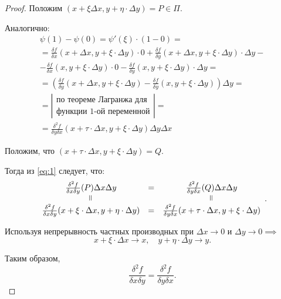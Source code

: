 \begin{proof}
    Положим $ (x + \xi \Delta x, y + \eta\cdot \Delta y) = P \in \Pi $.

    Аналогично:
    \begin{multline*}
        \psi(1) - \psi(0) = \psi'(\xi) \cdot (1-0) = \\
        = \frac{\delta f}{\delta x}(x + \Delta x, y + \xi \cdot \Delta y) \cdot 0 + \frac{\delta f}{\delta y}(x + \Delta x, y + \xi \cdot \Delta y) \cdot \Delta y - \\
        - \frac{\delta f}{\delta x}(x, y + \xi \cdot \Delta y) \cdot 0 - \frac{\delta f}{\delta y}(x, y + \xi \cdot \Delta y) \cdot \Delta y = \\
        = \left(\frac{\delta f}{\delta y}(x + \Delta x,y + \xi \cdot \Delta y) - \frac{\delta f}{\delta y}(x, y + \xi \cdot \Delta y)\right) \Delta y = \\
        = \left|\begin{array}{c}
            \text{по теореме Лагранжа для} \\
            \text{функции 1-ой переменной}
        \end{array}\right| = \\
        = \frac{\delta^2f}{\delta y\delta x}(x + \tau \cdot \Delta x, y + \xi \cdot \Delta y)\Delta y \Delta x
    \end{multline*}

    Положим, что $ (x + \tau\cdot \Delta x, y + \xi \cdot \Delta y) = Q $.

    Тогда из \ref{eq:1} следует, что:
    \[
        \begin{array}{ccc}
            \frac{\delta^2f}{\delta x\delta y}(P)\Delta x\Delta y                             & = & \frac{\delta^2f}{\delta y\delta x}(Q)\Delta x\Delta y                           \\
            \verteq                                                                           &   & \verteq                                                                         \\
            \frac{\delta^2f}{\delta x\delta y}(x + \xi \cdot \Delta x, y + \eta\cdot\Delta y) & = & \frac{\delta^2f}{\delta y\delta x}(x + \tau \cdot \Delta x, y+\xi\cdot\Delta y)
        \end{array}.
    \]

    Используя непрерывность частных производных при $ \Delta x \rightarrow0 $ и $ \Delta y \rightarrow0 \implies $
    \[
        x + \xi \cdot \Delta x \rightarrow x, \quad y + \eta \cdot \Delta y \rightarrow y.
    \]

    Таким образом,
    \[
        \frac{\delta^2f}{\delta x\delta y} = \frac{\delta^2f}{\delta y\delta x}.
    \]
\end{proof}

